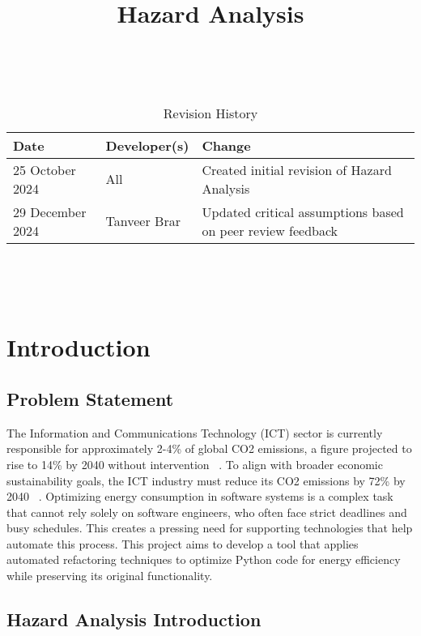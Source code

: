 \documentclass{article}
\title{Hazard Analysis\\\progname}
\author{\authname}
\date{}
\begin{document}
\maketitle
\thispagestyle{empty}

~\newpage


\begin{table}[hp]
\caption{Revision History} \label{TblRevisionHistory}
\begin{tabularx}{\textwidth}{llX}
\toprule
\textbf{Date} & \textbf{Developer(s)} & \textbf{Change}\\
\midrule
25 October 2024 & All & Created initial revision of Hazard Analysis\\
29 December 2024 & Tanveer Brar & Updated critical assumptions based on peer review feedback\\
\bottomrule
\end{tabularx}
\end{table}

~\newpage

\tableofcontents

~\newpage




\section{Introduction}

\subsection{Problem Statement}
The Information and Communications Technology (ICT) sector is currently responsible
for approximately 2-4\% of global CO2 emissions, a figure projected to rise to 14\% 
by 2040 without intervention ~\citep{BelkhirAndElmeligi2018}. To align with broader 
economic sustainability goals, the ICT industry must reduce its CO2 emissions by 72\% 
by 2040 ~\citep{FreitagAndBernersLee2021}. Optimizing energy consumption in software 
systems is a complex task that cannot rely solely on software engineers, who often 
face strict deadlines and busy schedules. This creates a pressing need for supporting 
technologies that help automate this process. This project aims to develop a tool that 
applies automated refactoring techniques to optimize Python code for energy efficiency 
while preserving its original functionality. 

\subsection{Hazard Analysis Introduction}
\end{document}
